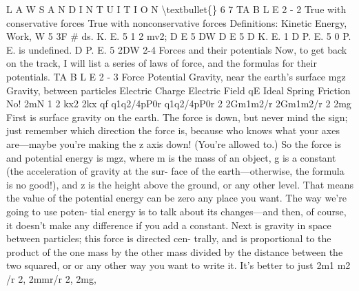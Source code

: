 \documentclass[10pt,oneside]{article}
\begin{document}
L A W S  A N D  I N T U I T I O N \textbackslash{}textbullet\{\} 6 7 TA B L E  2 - 2 True with conservative forces True with nonconservative forces Definitions: Kinetic Energy, Work, W 5 3F \# ds. K. E. 5 1 2  mv2; D E 5 DW D E 5 D K. E. 1 D P. E. 5 0 P. E. is undefined. D P. E. 5 2DW 2-4 Forces and their potentials Now, to get back on the track, I will list a series of laws of force, and the formulas for their potentials. TA B L E 2 - 3 Force Potential Gravity, near the earth’s surface mgz Gravity, between particles Electric Charge Electric Field qE Ideal Spring Friction No! 2mN 1 2 kx2 2kx qf q1q2/4pP0r q1q2/4pP0r 2 2Gm1m2/r 2Gm1m2/r 2 2mg First is surface gravity on the earth. The force is down, but never mind the sign; just remember which direction the force is, because who knows what your axes are---maybe you’re making the z axis down! (You’re allowed to.) So the force is and potential energy is mgz, where m is the mass of an object, g is a constant (the acceleration of gravity at the sur- face of the earth---otherwise, the formula is no good!), and z is the height above the ground, or any other level. That means the value of the potential energy can be zero any place you want. The way we’re going to use poten- tial energy is to talk about its changes---and then, of course, it doesn’t make any difference if you add a constant. Next is gravity in space between particles; this force is directed cen- trally, and is proportional to the product of the one mass by the other mass divided by the distance between the two squared, or or any other way you want to write it. It’s better to just 2m1 m2 /r 2, 2mmr/r 2, 2mg,\par
\end{document}
